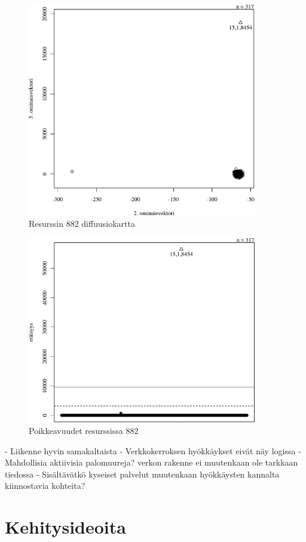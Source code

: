 \begin{figure}[p]
\centering
\includegraphics[width=10cm]{pics/diffuusiokuvat/service_882.pdf}
\caption{Resurssin 882 diffuusiokartta}
\label{diffusio_882}
\end{figure}

\begin{figure}[p]
\centering
\includegraphics[width=10cm]{pics/tiheyskuvat/service_882.pdf}
\caption{Poikkeavuudet resurssissa 882}
\label{service_882}
\end{figure}

- Liikenne hyvin samakaltaista
- Verkkokerroksen hyökkäykset eivät näy logissa
- Mahdollisia aktiivisia palomuureja? verkon rakenne ei muutenkaan ole tarkkaan tiedossa
- Sisältävätkö kyseiset palvelut muutenkaan hyökkäysten kannalta kiinnostavia kohteita?


\section{Kehitysideoita}

